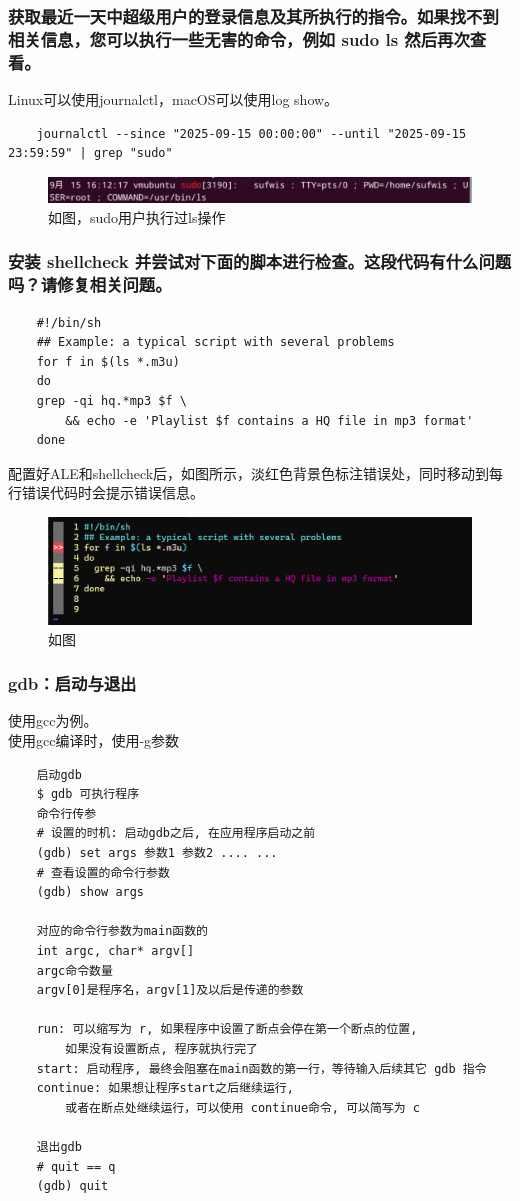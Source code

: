 \documentclass[UTF8]{ctexart}
\begin{document}
\subsubsection{获取最近一天中超级用户的登录信息及其所执行的指令。如果找不到相关信息，您可以执行一些无害的命令，例如 sudo ls 然后再次查看。}
Linux可以使用journalctl，macOS可以使用log show。
\begin{lstlisting}
	journalctl --since "2025-09-15 00:00:00" --until "2025-09-15 23:59:59" | grep "sudo"
\end{lstlisting}
\begin{figure}[H]
	\centering
	\includegraphics[width=0.7\linewidth]{figure/journal.png}
	\caption{如图，sudo用户执行过ls操作}
\end{figure}

\subsubsection{安装 shellcheck 并尝试对下面的脚本进行检查。这段代码有什么问题吗？请修复相关问题。}
\begin{lstlisting}
	#!/bin/sh
	## Example: a typical script with several problems
	for f in $(ls *.m3u)
	do
	grep -qi hq.*mp3 $f \
		&& echo -e 'Playlist $f contains a HQ file in mp3 format'
	done
\end{lstlisting}
\indent	配置好ALE和shellcheck后，如图所示，淡红色背景色标注错误处，同时移动到每行错误代码时会提示错误信息。
\begin{figure}[H]
	\centering
	\includegraphics[width=0.7\linewidth]{figure/shellcheck.png}
	\caption{如图}
\end{figure}


\subsubsection{gdb：启动与退出}
使用gcc为例。
\\
\indent 使用gcc编译时，使用-g参数
\begin{verbatim}
	启动gdb
	$ gdb 可执行程序
	命令行传参
	# 设置的时机: 启动gdb之后, 在应用程序启动之前
	(gdb) set args 参数1 参数2 .... ...
	# 查看设置的命令行参数
	(gdb) show args

	对应的命令行参数为main函数的
	int argc, char* argv[]
	argc命令数量
	argv[0]是程序名，argv[1]及以后是传递的参数

	run: 可以缩写为 r, 如果程序中设置了断点会停在第一个断点的位置, 
		如果没有设置断点, 程序就执行完了
	start: 启动程序, 最终会阻塞在main函数的第一行，等待输入后续其它 gdb 指令
	continue: 如果想让程序start之后继续运行, 
		或者在断点处继续运行，可以使用 continue命令, 可以简写为 c

	退出gdb
	# quit == q
	(gdb) quit
\end{verbatim}
\end{document}
